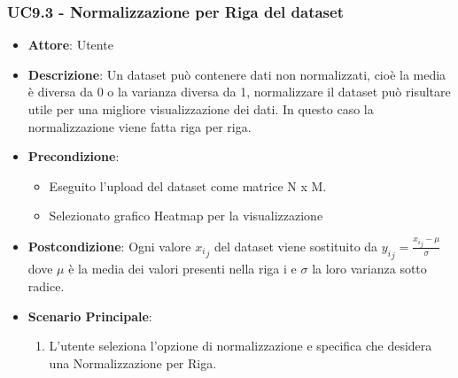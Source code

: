     \subsubsection{UC9.3 - Normalizzazione per Riga del dataset}
    \label{uc9.3}
    \begin{itemize}
    \item \textbf{Attore}: Utente
    \item \textbf{Descrizione}: Un dataset può contenere dati non normalizzati, cioè la media è diversa da 0 o la varianza diversa da 1, normalizzare il dataset può risultare utile per una migliore visualizzazione dei dati.
    In questo caso la normalizzazione viene fatta riga per riga.
    \item \textbf{Precondizione}: 
    \begin{itemize}
        \item Eseguito l'upload del dataset come matrice N x M.
        \item Selezionato grafico Heatmap per la visualizzazione
    \end{itemize}  
    \item \textbf{Postcondizione}:  Ogni valore \({x_i}_j\) del dataset viene sostituito da \( {y_i}_j = \frac{{x_i}_j - \mu}{\sigma}\) dove \(\mu\) è la media dei valori presenti nella riga i e \(\sigma\) la loro varianza sotto radice.
    \item \textbf{Scenario Principale}: 
    \begin{enumerate}
        \item L'utente seleziona l'opzione di normalizzazione e specifica che desidera una Normalizzazione per Riga. 
    \end{enumerate}  
    \end{itemize}
    

